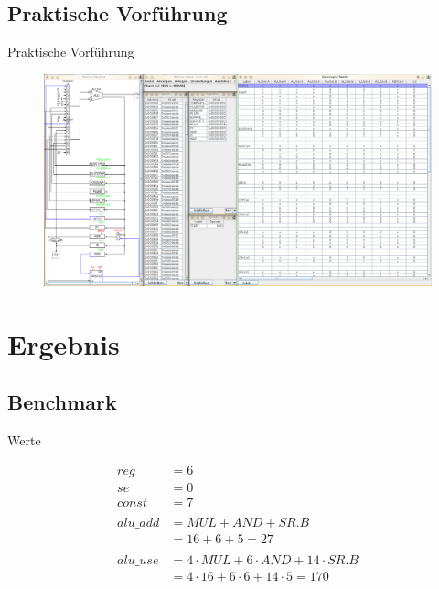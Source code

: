 \documentclass{beamer}
\begin{document}
\subsection{Praktische Vorführung}



\begin{frame}{Praktische Vorführung}

\begin{figure}
    \includegraphics[width=\textwidth]{res/simulator.png}
\end{figure}

\end{frame}



\section{Ergebnis}



\subsection{Benchmark}



\begin{frame}{Werte}

{\footnotesize\begin{align*}
    reg      &= 6 \\
    se       &= 0 \\
    const    &= 7 \\ \\
    alu\_add &= MUL + AND + SR.B \\
             &= 16 + 6 + 5 = 27 \\ \\
    alu\_use &= 4 \cdot MUL + 6 \cdot AND + 14 \cdot SR.B \\
             &= 4 \cdot 16 + 6 \cdot 6 + 14 \cdot 5 = 170
\end{align*}}

\end{frame}
\end{document}
